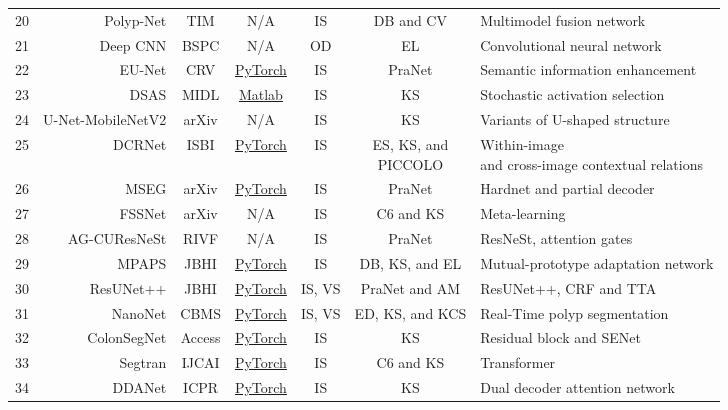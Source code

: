 \documentclass[journal]{IEEEtran}
\begin{document}
\begin{table*}[t!]
\begin{tabular}{r|r|c|c|c|c|l}
   20&Polyp-Net & TIM  & N/A & IS     & DB and CV &  Multimodel fusion network \\
    
    21&Deep CNN & BSPC   & N/A& OD     & EL &   Convolutional neural network \\
    
    22&EU-Net & CRV  & \href{https://github.com/rucv/Enhanced-U-Net}{PyTorch} & IS      & PraNet &  Semantic information enhancement \\
    23&DSAS & MIDL  & \href{https://github.com/LorisNanni/Deep-ensembles-based-on-Stochastic-Activation-Selection-for-Polyp-Segmentation}{Matlab} &  IS     &  KS & Stochastic activation selection\\
    24&U-Net-MobileNetV2 & arXiv  & N/A    &    IS   & KS & Variants of U-shaped structure \\
   25 &DCRNet & ISBI  & \href{https://github.com/PRIS-CV/DCRNet}{PyTorch}&    IS   &\makecell[c]{ES, KS, and\\PICCOLO}    &\makecell[l]{Within-image \\and cross-image contextual relations}   \\
    26&MSEG & arXiv   & \href{https://github.com/james128333/HarDNet-MSEG}{PyTorch} &IS       & PraNet & Hardnet and partial decoder\\
    27&FSSNet & arXiv   & N/A   &       IS & C6 and KS &Meta-learning\\
    28&AG-CUResNeSt& RIVF   & N/A    &    IS   & PraNet &  ResNeSt, attention gates\\
   29 &MPAPS & JBHI   & \href{https://github.com/CityU-AIM-Group/MPA-DA}{PyTorch}   &       IS &  DB, KS, and EL & Mutual-prototype adaptation network \\  
    30&ResUNet++ & JBHI    & \href{https://github.com/DebeshJha/ResUNetPlusPlus-with-CRF-and-TTA}{PyTorch} &  IS, VS     & PraNet and AM & ResUNet++, CRF and TTA\\
   31 &NanoNet & CBMS   & \href{https://github.com/DebeshJha/NanoNet}{PyTorch} &  IS, VS     & ED, KS, and KCS & Real-Time polyp segmentation\\
   32 &ColonSegNet  & Access  & \href{https://github.com/DebeshJha/ColonSegNet}{PyTorch} & IS   & KS   &  Residual block and SENet\\
    33&Segtran & IJCAI  & \href{https://github.com/askerlee/segtran}{PyTorch}&   IS    & C6 and KS& Transformer\\
    34&DDANet & ICPR   & 
    \href{https://github.com/nikhilroxtomar/DDANet }{PyTorch}&    IS   & KS & Dual decoder attention network\\

\end{tabular}
\end{table*}
\end{document}
